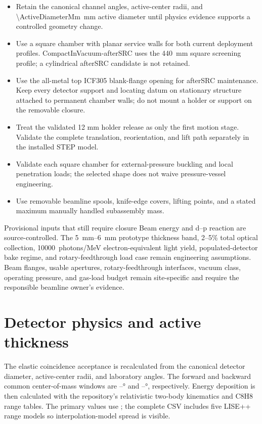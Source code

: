 \documentclass[10pt,letterpaper]{article}
\begin{document}
\begin{itemize}
  \item Retain the canonical channel angles, active-center radii, and
    \SI{\ActiveDiameterMm}{\milli\meter} active diameter until physics evidence supports a
    controlled geometry change.
  \item Use a square chamber with planar service walls for both current deployment profiles.
    CompactInVacuum-afterSRC uses the \SI{440}{\milli\meter} square screening profile; a
    cylindrical afterSRC candidate is not retained.
  \item Use the all-metal top ICF305 blank-flange opening for afterSRC maintenance. Keep every
    detector support and locating datum on stationary structure attached to permanent chamber
    walls; do not mount a holder or support on the removable closure.
  \item Treat the validated 12 mm holder release as only the first motion stage. Validate the
    complete translation, reorientation, and lift path separately in the installed STEP model.
  \item Validate each square chamber for external-pressure buckling and local penetration
    loads; the selected shape does not waive pressure-vessel engineering.
  \item Use removable beamline spools, knife-edge covers, lifting points, and a stated
    maximum manually handled subassembly mass.
\end{itemize}

\begin{notebox}{Provisional inputs that still require closure}
  Beam energy and d--p reaction are source-controlled. The \SIrange{5}{6}{\milli\meter}
  prototype thickness band, 2--5\% total optical collection,
  \SI{10000}{photons/MeV} electron-equivalent light yield, populated-detector bake regime,
  and rotary-feedthrough load case remain engineering assumptions. Beam flanges, usable
  apertures, rotary-feedthrough interfaces, vacuum class, operating pressure, and gas-load
  budget remain site-specific and require the responsible beamline owner's evidence.
\end{notebox}

\section{Detector physics and active thickness}

The elastic coincidence acceptance is recalculated from the canonical detector diameter,
active-center radii, and laboratory angles. The forward and backward common center-of-mass
windows are \ForwardCmLow--\ForwardCmHigh\si{\degree} and
\BackwardCmLow--\BackwardCmHigh\si{\degree}, respectively. Energy deposition is then
calculated with the repository's relativistic two-body kinematics and C8H8 range tables.
The primary values use \LisePrimaryRangeModel; the complete CSV includes five LISE++ range
models so interpolation-model spread is visible.
\end{document}
